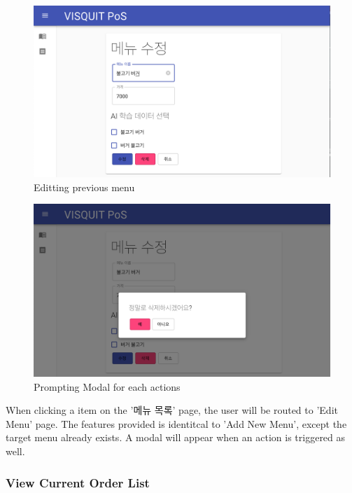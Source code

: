 \documentclass[conference,compsoc]{IEEEtran}
\begin{document}
\begin{figure}[ht!]
  \includegraphics[width=\linewidth]{figures/frontend/06-editmenu-landing.png}
  \caption{Editting previous menu}
  \label{fig:06-editmenu-landing}
\end{figure}
\begin{figure}[ht!]
  \includegraphics[width=\linewidth]{figures/frontend/07-editmenu-modal.png}
  \caption{Prompting Modal for each actions}
  \label{fig:07-editmenu-modal}
\end{figure}

When clicking a item on the '메뉴 목록' page, the user will be routed to 'Edit Menu' page. The features provided is identitcal to 'Add New Menu', except the target menu already exists. A modal will appear when an action is triggered as well.

\subsubsection{View Current Order List}
\end{document}
